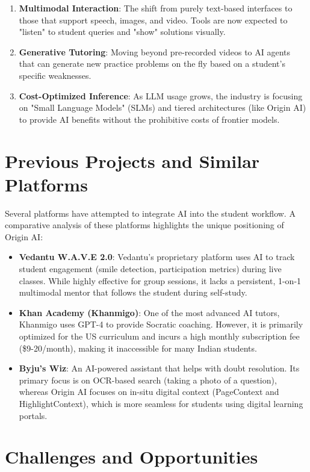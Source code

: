 \begin{enumerate}
    \item \textbf{Multimodal Interaction}: The shift from purely text-based interfaces to those that support speech, images, and video. Tools are now expected to "listen" to student queries and "show" solutions visually.
    \item \textbf{Generative Tutoring}: Moving beyond pre-recorded videos to AI agents that can generate new practice problems on the fly based on a student's specific weaknesses.
    \item \textbf{Cost-Optimized Inference}: As LLM usage grows, the industry is focusing on "Small Language Models" (SLMs) and tiered architectures (like Origin AI) to provide AI benefits without the prohibitive costs of frontier models.
\end{enumerate}

\section{Previous Projects and Similar Platforms}

Several platforms have attempted to integrate AI into the student workflow. A comparative analysis of these platforms highlights the unique positioning of Origin AI:

\begin{itemize}
    \item \textbf{Vedantu W.A.V.E 2.0}: Vedantu's proprietary platform uses AI to track student engagement (smile detection, participation metrics) during live classes. While highly effective for group sessions, it lacks a persistent, 1-on-1 multimodal mentor that follows the student during self-study.
    \item \textbf{Khan Academy (Khanmigo)}: One of the most advanced AI tutors, Khanmigo uses GPT-4 to provide Socratic coaching. However, it is primarily optimized for the US curriculum and incurs a high monthly subscription fee (\$9-20/month), making it inaccessible for many Indian students.
    \item \textbf{Byju's Wiz}: An AI-powered assistant that helps with doubt resolution. Its primary focus is on OCR-based search (taking a photo of a question), whereas Origin AI focuses on in-situ digital context (PageContext and HighlightContext), which is more seamless for students using digital learning portals.
\end{itemize}

\section{Challenges and Opportunities}

